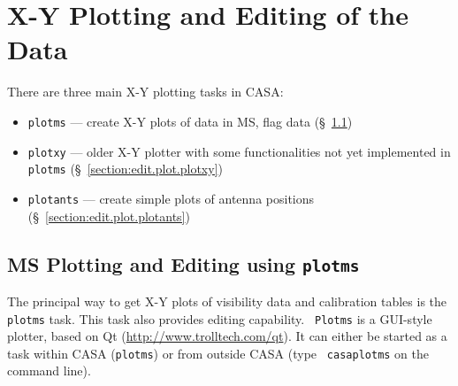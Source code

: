  

\section{X-Y Plotting and Editing of the Data}
\label{section:edit.plot}

There are three main X-Y plotting tasks in CASA:
\begin{itemize}
   \item {\tt plotms} --- create X-Y plots of data in MS, flag data
      (\S~\ref{section:edit.plot.plotms})
   \item {\tt plotxy} --- older X-Y plotter with some functionalities not yet implemented in {\tt plotms}
      (\S~\ref{section:edit.plot.plotxy})
   \item {\tt plotants} --- create simple plots of antenna positions
      (\S~\ref{section:edit.plot.plotants})
\end{itemize}

\subsection{MS Plotting and Editing using {\tt plotms}}
\label{section:edit.plot.plotms}

The principal way to get X-Y plots of visibility data and calibration
tables is the {\tt
  plotms} task. This task also provides editing capability. {\tt
  Plotms} is a GUI-style plotter, based on Qt
(\url{http://www.trolltech.com/qt}). It can either be started as a
task within CASA ({\tt plotms}) or from outside CASA (type {\tt
  casaplotms} on the command line).

